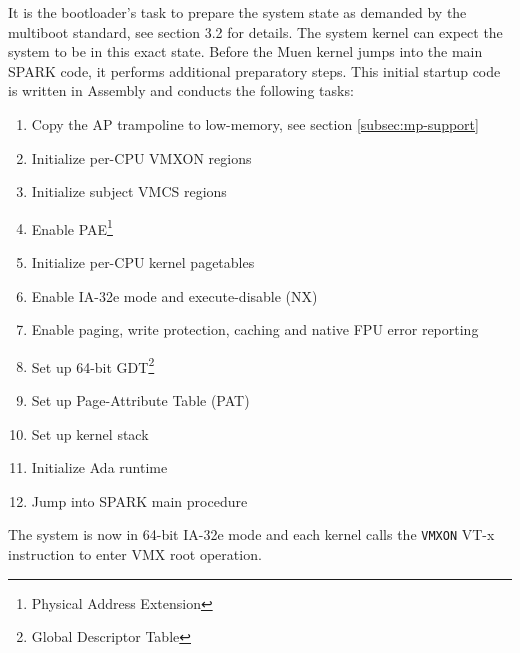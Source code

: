It is the bootloader's task to prepare the system state as demanded by the
multiboot standard, see \cite{multiboot} section 3.2 for details. The system
kernel can expect the system to be in this exact state. Before the Muen kernel
jumps into the main SPARK code, it performs additional preparatory steps. This
initial startup code is written in Assembly and conducts the following tasks:

\begin{enumerate}
	\item Copy the AP trampoline to low-memory, see section
		\ref{subsec:mp-support} \item Initialize per-CPU VMXON regions
	\item Initialize subject VMCS regions
	\item Enable PAE\footnote{Physical Address Extension}
	\item Initialize per-CPU kernel pagetables
	\item Enable IA-32e mode and execute-disable (NX)
	\item Enable paging, write protection, caching and native FPU error
		reporting
	\item Set up 64-bit GDT\footnote{Global Descriptor Table}
	\item Set up Page-Attribute Table (PAT)
	\item Set up kernel stack
	\item Initialize Ada runtime
	\item Jump into SPARK main procedure
\end{enumerate}

The system is now in 64-bit IA-32e mode and each kernel calls the \texttt{VMXON}
VT-x instruction to enter VMX root operation.

